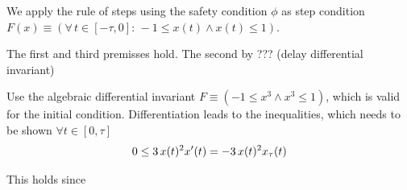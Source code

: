 \documentclass[10pt]{article}
\begin{document}
We apply the rule of steps using the safety condition $\phi$ as step condition $F(x)\equiv(\forall\,t\in[-\tau,0]:\,-1\leq x(t)\wedge x(t)\leq 1)$.

The first and third premisses hold. The second by ??? (delay differential invariant)

Use the algebraic differential invariant $F\equiv(-1\leq x^3\wedge x^3\leq1)$, which is valid for the initial condition. Differentiation leads to the inequalities, which needs to be shown $\forall t\in[0,\tau]$
\begin{equation}
    0\leq 3\,x(t)^2 x'(t) = -3\,x(t)^2 x_{\tau}(t)
\end{equation}

This holds since
\end{document}
